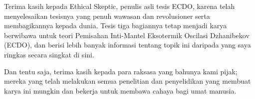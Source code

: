 \documentclass[10pt,twocolumn,letterpaper]{article}
\begin{document}
Terima kasih kepada Ethical Skeptic, penulis asli tesis ECDO, karena telah menyelesaikan tesisnya yang penuh wawasan dan revolusioner serta membagikannya kepada dunia. Tesis tiga bagiannya \cite{1} tetap menjadi karya berwibawa untuk teori Pemisahan Inti-Mantel Eksotermik Oscilasi Dzhanibekov (ECDO), dan berisi lebih banyak informasi tentang topik ini daripada yang saya ringkas secara singkat di sini.

Dan tentu saja, terima kasih kepada para raksasa yang bahunya kami pijak; mereka yang telah melakukan semua penelitian dan penyelidikan yang membuat karya ini mungkin dan bekerja untuk membawa cahaya bagi umat manusia.

{\small


}
\end{document}
